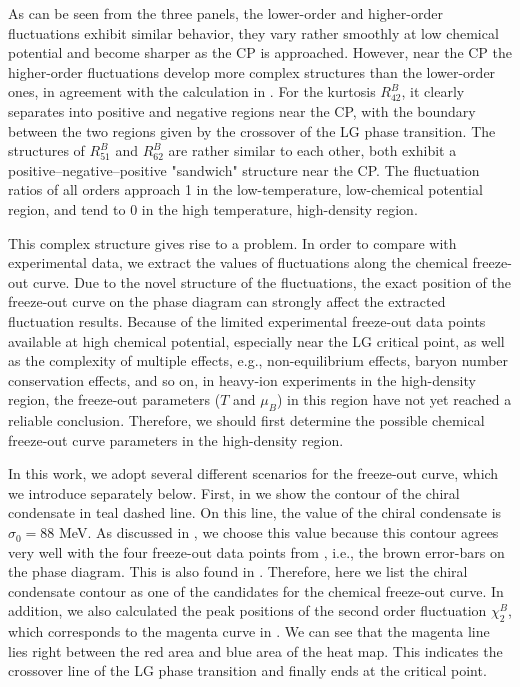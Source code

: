 \documentclass[aps,twocolumn,prd,superscriptaddress,nofootinbib,floatfix]{revtex4-2}
\def\Fig#1{\Cref{#1}}
\begin{document}
As can be seen from the three panels, the lower-order and higher-order fluctuations exhibit similar behavior, they vary rather smoothly at low chemical potential and become sharper as the CP is approached. However, near the CP the higher-order fluctuations develop more complex structures than the lower-order ones, in agreement with the calculation in \cite{Fu:2023lcm}. For the kurtosis $R^B_{42}$, it clearly separates into positive and negative regions near the CP, with the boundary between the two regions given by the crossover of the LG phase transition. The structures of $R^B_{51}$ and $R^B_{62}$ are rather similar to each other, both exhibit a positive–negative–positive "sandwich" structure near the CP. The fluctuation ratios of all orders approach 1 in the low-temperature, low-chemical potential region, and tend to 0 in the high temperature, high-density region.

This complex structure gives rise to a problem. In order to compare with experimental data, we extract the values of fluctuations along the chemical freeze-out curve. Due to the novel structure of the fluctuations, the exact position of the freeze-out curve on the phase diagram can strongly affect the extracted fluctuation results. Because of the limited experimental freeze-out data points available at high chemical potential, especially near the LG critical point, as well as the complexity of multiple effects, e.g., non-equilibrium effects, baryon number conservation effects, and so on, in heavy-ion experiments in the high-density region, the freeze-out parameters ($T$ and $\mu_B$) in this region have not yet reached a reliable conclusion. Therefore, we should first determine the possible chemical freeze-out curve parameters in the high-density region. 

In this work, we adopt several different scenarios for the freeze-out curve, which we introduce separately below. First, in \Fig{fig:phasePDM_all} we show the contour of the chiral condensate in teal dashed line. On this line, the value of the chiral condensate is $\sigma_0=88$ MeV. As discussed in \cite{Recchi:2025pyy}, we choose this value because this contour agrees very well with the four freeze-out data points from \cite{Andronic:2017pug}, i.e., the brown error-bars on the phase diagram. This is also found in \cite{Floerchinger:2012xd}. Therefore, here we list the chiral condensate contour as one of the candidates for the chemical freeze-out curve. In addition, we also calculated the peak positions of the second order fluctuation $\chi^B_2$, which corresponds to the magenta curve in \Fig{fig:phasePDM_all}. We can see that the magenta line lies right between the red area and blue area of the heat map. This indicates the crossover line of the LG phase transition and finally ends at the critical point.
\end{document}

